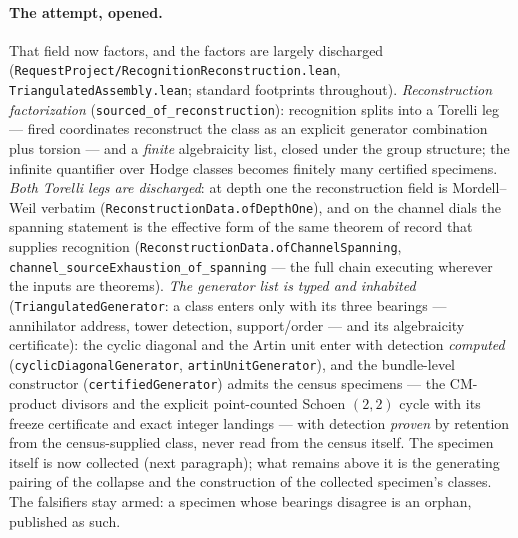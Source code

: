 \documentclass[11pt]{article}
\theoremstyle{definition}
\theoremstyle{remark}
\begin{document}
\paragraph{The attempt, opened.} That field now factors, and the factors are
largely discharged
(\texttt{RequestProject/RecognitionReconstruction.lean},
\texttt{TriangulatedAssembly.lean}; standard footprints throughout).
\emph{Reconstruction factorization}
(\texttt{sourced\_of\_reconstruction}): recognition splits into a Torelli leg
--- fired coordinates reconstruct the class as an explicit generator
combination plus torsion --- and a \emph{finite} algebraicity list, closed
under the group structure; the infinite quantifier over Hodge classes becomes
finitely many certified specimens. \emph{Both Torelli legs are discharged}:
at depth one the reconstruction field is Mordell--Weil verbatim
(\texttt{ReconstructionData.ofDepthOne}), and on the channel dials the
spanning statement is the effective form of the same theorem of record that
supplies recognition (\texttt{ReconstructionData.ofChannelSpanning},
\texttt{channel\_sourceExhaustion\_of\_spanning} --- the full chain executing
wherever the inputs are theorems). \emph{The generator list is typed and
inhabited} (\texttt{TriangulatedGenerator}: a class enters only with its
three bearings --- annihilator address, tower detection, support/order ---
and its algebraicity certificate): the cyclic diagonal and the Artin unit
enter with detection \emph{computed} (\texttt{cyclicDiagonalGenerator},
\texttt{artinUnitGenerator}), and the bundle-level constructor
(\texttt{certifiedGenerator}) admits the census specimens --- the CM-product
divisors and the explicit point-counted Schoen $(2,2)$ cycle with its freeze
certificate and exact integer landings --- with detection \emph{proven} by
retention from the census-supplied class, never read from the census itself.
The specimen itself is now collected (next paragraph); what remains above it
is the generating pairing of the collapse and the construction of the
collected specimen's classes. The falsifiers stay armed: a specimen whose
bearings disagree is an orphan, published as such.
\end{document}
